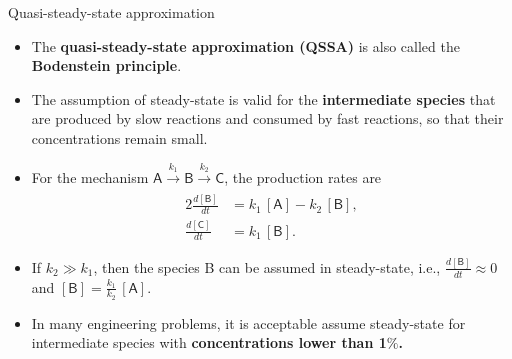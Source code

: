 \begin{frame}{Quasi-steady-state approximation}
	\begin{itemize}
		\item  The \alert{\bf quasi-steady-state approximation (QSSA)} is also called the \alert{\bf Bodenstein principle}.
		\pause
		\item The assumption of steady-state is valid for the \alert{\bf intermediate species} that are produced by slow 
		reactions and consumed by fast reactions, so that their concentrations remain small.
		\pause	
		\item For the mechanism	$\mathsf{A} \xrightarrow[]{k_1} \mathsf{B} 
		\xrightarrow[]{k_2}  \mathsf{C}$, 
		the production rates are
		\begin{alignat*}{2}
			\tfrac{d\mathsf{[B]}}{dt}  & =  k_{1} \,\mathsf{[A]}   -k_2 \, \mathsf{[B]}, \\
			\tfrac{d\mathsf{[C]}}{dt} & = k_1 \, \mathsf{[B]}.
		\end{alignat*}
		\pause
		\item If $k_2 \gg k_1$, then the species B can be assumed in steady-state, i.e., $\tfrac{d\mathsf{[B]}}{dt} \approx 0$ and $\mathsf{[B]} = \tfrac{k_1}{k_2} \, \mathsf{[A]}$.
		\pause
		\item In many engineering problems, it is acceptable assume steady-state for intermediate species with {\bf concentrations lower than 1$\%$.}
		\end{itemize}
\end{frame}
%
